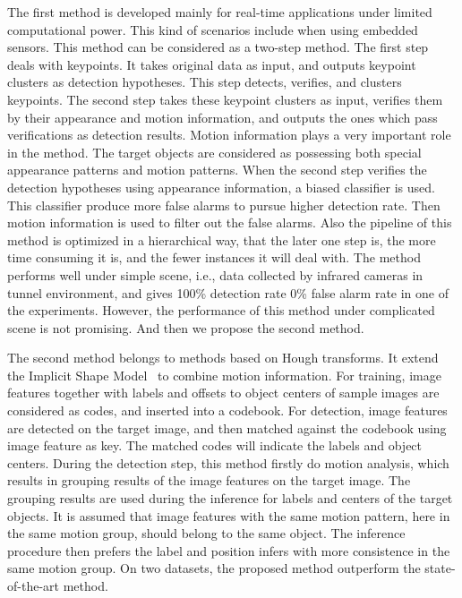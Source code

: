  The first method is developed mainly for real-time applications under limited computational power. This kind of scenarios include when using embedded sensors. This method can be considered as a two-step method. The first step deals with keypoints. It
takes original data as input, and outputs keypoint clusters as detection hypotheses. This step detects, verifies, and clusters keypoints. The second
step takes these keypoint clusters as input, verifies them by their appearance and motion
information, and outputs the ones which pass verifications as detection results. Motion information plays a very important role in the method. The target objects are considered as possessing both special appearance patterns and motion patterns. When the second step verifies the detection hypotheses using appearance information, a biased classifier is used. This classifier produce more false alarms to pursue higher detection rate. Then motion information is used to filter out the false alarms. Also the pipeline of this method is optimized in a hierarchical way, that the later one step is, the more time consuming it is, and the fewer instances it will deal with. The method performs well under simple scene, i.e., data collected by infrared cameras in tunnel environment, and gives 100\% detection rate 0\% false alarm rate in one of the experiments. However, the performance of this method under complicated scene is not promising. And then we propose the second method.

The second method belongs to methods based on Hough transforms. It extend the Implicit Shape Model~\citep{lb1} to combine motion information. For training, image features together with labels and offsets to object centers of sample images are considered as codes, and inserted into a codebook. For detection, image features are detected on the target image, and then matched against the codebook using image feature as key. The matched codes will indicate the labels and object centers. During the detection step, this method firstly do motion analysis, which results in grouping results of the image features on the target image. The grouping results are used during the inference for labels and centers of the target objects. It is assumed that image features with the same motion pattern, here in the same motion group, should belong to the same object. The inference procedure then prefers the label and position infers with more consistence in the same motion group. On two datasets, the proposed method outperform the state-of-the-art method.

